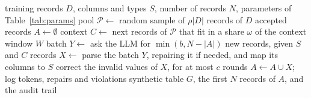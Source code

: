 \documentclass[conference]{IEEEtran}
\newcommand{\system}{\textsc{Synthagent}\xspace}
\providecommand{\DIFaddbegin}{} %
\providecommand{\DIFaddend}{} %
\providecommand{\DIFdelbegin}{} %
\providecommand{\DIFdelend}{} %
\newcommand{\DIFscaledelfig}{0.5}
\newlength{\DIFdelgraphicswidth} %
\newlength{\DIFdelgraphicsheight} %
\newcommand{\DIFaddincludegraphics}[2][]{{\color{blue}\fbox{\DIFOincludegraphics[#1]{#2}}}} %
\newcommand{\DIFdelincludegraphics}[2][]{%
\sbox{\DIFdelgraphicsbox}{\DIFOincludegraphics[#1]{#2}}%
\settoboxwidth{\DIFdelgraphicswidth}{\DIFdelgraphicsbox} %
\settoboxtotalheight{\DIFdelgraphicsheight}{\DIFdelgraphicsbox} %
\scalebox{\DIFscaledelfig}{%
\parbox[b]{\DIFdelgraphicswidth}{\usebox{\DIFdelgraphicsbox}\\[-\baselineskip] \rule{\DIFdelgraphicswidth}{0em}}\llap{\resizebox{\DIFdelgraphicswidth}{\DIFdelgraphicsheight}{%
\setlength{\unitlength}{\DIFdelgraphicswidth}%
\begin{picture}(1,1)%
\thicklines\linethickness{2pt} %
{\color[rgb]{1,0,0}\put(0,0){\framebox(1,1){}}}%
{\color[rgb]{1,0,0}\put(0,0){\line( 1,1){1}}}%
{\color[rgb]{1,0,0}\put(0,1){\line(1,-1){1}}}%
\end{picture}%
}\hspace*{3pt}}} %
} %
\DeclareRobustCommand{\DIFaddbegin}{\DIFOaddbegin \let\includegraphics\DIFaddincludegraphics} %
\DeclareRobustCommand{\DIFaddend}{\DIFOaddend \let\includegraphics\DIFOincludegraphics} %
\DeclareRobustCommand{\DIFdelbegin}{\DIFOdelbegin \let\includegraphics\DIFdelincludegraphics} %
\DeclareRobustCommand{\DIFdelend}{\DIFOaddend \let\includegraphics\DIFOincludegraphics} %
\begin{document}
\begin{algorithm}[t]
\caption{Generation procedure of \system}
\label{alg:loop}
\small
\DIFdelbegin %
\DIFdelend \DIFaddbegin \begin{algorithmic}[1]
\Require training records $D$, columns and types $S$, number of records $N$, parameters of Table~\ref{tab:params}
\State pool $\mathcal{P}\gets$ random sample of $\rho|D|$ records of $D$
\State accepted records $A\gets\emptyset$ 
\Repeat
  \State context $C\gets$ next records of $\mathcal{P}$ that fit in a share $\omega$ of the context window $W$ 
  \State batch $Y\gets$ ask the LLM for $\min(b,N-|A|)$ new records, given $S$ and $C$ 
  \State records $X\gets$ parse the batch $Y$, repairing it if needed, and map its columns to $S$ 
  \State correct the invalid values of $X$, for at most $c$ rounds 
  \State $A\gets A\cup X$; log tokens, repairs and violations 
\State \Return synthetic table $G$, the first $N$ records of $A$, and the audit trail
\end{algorithmic}
\DIFaddend \end{algorithm}
\end{document}
